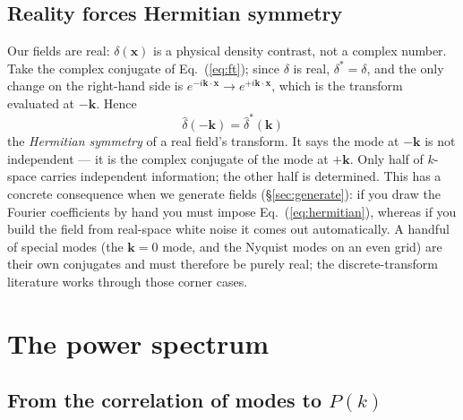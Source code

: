\documentclass[12pt]{article}
\newcommand{\bk}{\mathbf{k}}
\newcommand{\bx}{\mathbf{x}}
\begin{document}
\subsection{Reality forces Hermitian symmetry}
\label{sec:hermitian}

Our fields are real: $\delta(\bx)$ is a physical density contrast, not a
complex number.  Take the complex conjugate of Eq.~(\ref{eq:ft}); since
$\delta$ is real, $\delta^* = \delta$, and the only change on the
right-hand side is $e^{-i\bk\cdot\bx} \to e^{+i\bk\cdot\bx}$, which is
the transform evaluated at $-\bk$.  Hence
\begin{equation}
  \boxed{\;\hat\delta(-\bk) = \hat\delta^*(\bk)\;}
  \label{eq:hermitian}
\end{equation}
the \emph{Hermitian symmetry} of a real field's transform.  It says the
mode at $-\bk$ is not independent --- it is the complex conjugate of the
mode at $+\bk$.  Only half of $k$-space carries independent information;
the other half is determined.  This has a concrete consequence when we
generate fields (\S\ref{sec:generate}): if you draw the Fourier
coefficients by hand you must impose Eq.~(\ref{eq:hermitian}), whereas if
you build the field from real-space white noise it comes out
automatically.  A handful of special modes (the $\bk = 0$ mode, and the
Nyquist modes on an even grid) are their own conjugates and must
therefore be purely real; the discrete-transform literature works
through those corner cases.

\section{The power spectrum}
\label{sec:pk}

\subsection{From the correlation of modes to $P(k)$}
\label{sec:pk-derive}
\end{document}
